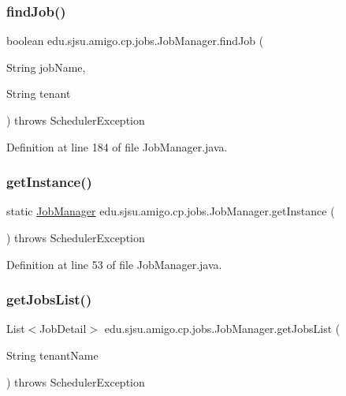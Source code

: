 \subsubsection{\texorpdfstring{find\+Job()}{findJob()}}
{\footnotesize\ttfamily boolean edu.\+sjsu.\+amigo.\+cp.\+jobs.\+Job\+Manager.\+find\+Job (\begin{DoxyParamCaption}\item[{String}]{job\+Name,  }\item[{String}]{tenant }\end{DoxyParamCaption}) throws Scheduler\+Exception}



Definition at line 184 of file Job\+Manager.\+java.

\mbox{\label{classedu_1_1sjsu_1_1amigo_1_1cp_1_1jobs_1_1_job_manager_aaeb161ffe7a75922ee34e5a9ebe8260a}} 
\subsubsection{\texorpdfstring{get\+Instance()}{getInstance()}}
{\footnotesize\ttfamily static \hyperlink{classedu_1_1sjsu_1_1amigo_1_1cp_1_1jobs_1_1_job_manager}{Job\+Manager} edu.\+sjsu.\+amigo.\+cp.\+jobs.\+Job\+Manager.\+get\+Instance (\begin{DoxyParamCaption}{ }\end{DoxyParamCaption}) throws Scheduler\+Exception\hspace{0.3cm}{\ttfamily [static]}}



Definition at line 53 of file Job\+Manager.\+java.

\mbox{\label{classedu_1_1sjsu_1_1amigo_1_1cp_1_1jobs_1_1_job_manager_a08f7571e06cbd3f1ea8e866b5439511f}} 
\subsubsection{\texorpdfstring{get\+Jobs\+List()}{getJobsList()}}
{\footnotesize\ttfamily List$<$Job\+Detail$>$ edu.\+sjsu.\+amigo.\+cp.\+jobs.\+Job\+Manager.\+get\+Jobs\+List (\begin{DoxyParamCaption}\item[{String}]{tenant\+Name }\end{DoxyParamCaption}) throws Scheduler\+Exception}

